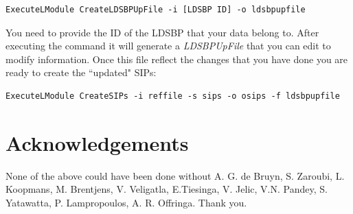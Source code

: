 \documentclass[a4paper,11pt]{article}
\begin{document}
\begin{verbatim}
ExecuteLModule CreateLDSBPUpFile -i [LDSBP ID] -o ldsbpupfile
\end{verbatim}

You need to provide the ID of the LDSBP that your data belong to. After executing the command it will generate a \textit{LDSBPUpFile} that you can edit to modify information. Once this file reflect the changes that you have done you are ready to create the ``updated" SIPs:

\begin{verbatim}
ExecuteLModule CreateSIPs -i reffile -s sips -o osips -f ldsbpupfile
\end{verbatim}


\section*{Acknowledgements}

None of the above could have been done without A. G. de Bruyn, S. Zaroubi, L. Koopmans, M. Brentjens, V. Veligatla, E.Tiesinga, V. Jelic, V.N. Pandey, S. Yatawatta, P. Lampropoulos, A. R. Offringa. Thank you.
\end{document}
